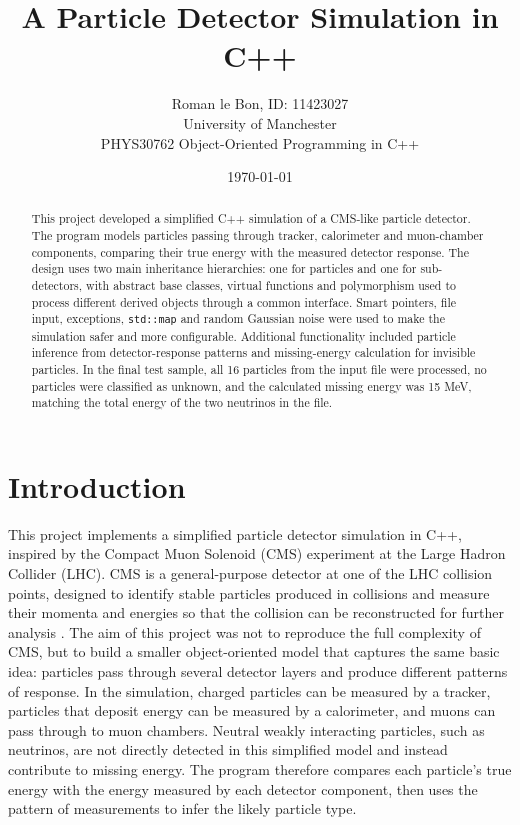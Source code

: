\documentclass[11pt,a4paper]{article}
\title{A Particle Detector Simulation in C++}
\author{Roman le Bon, ID: 11423027\\ University of Manchester \\ PHYS30762 Object-Oriented Programming in C++}
\date{\today}
\begin{document}
\maketitle

\begin{abstract}
This project developed a simplified C++ simulation of a CMS-like particle detector. The program models particles passing through tracker, calorimeter and muon-chamber components, comparing their true energy with the measured detector response. The design uses two main inheritance hierarchies: one for particles and one for sub-detectors, with abstract base classes, virtual functions and polymorphism used to process different derived objects through a common interface. Smart pointers, file input, exceptions, \texttt{std::map} and random Gaussian noise were used to make the simulation safer and more configurable. Additional functionality included particle inference from detector-response patterns and missing-energy calculation for invisible particles. In the final test sample, all 16 particles from the input file were processed, no particles were classified as unknown, and the calculated missing energy was 15 MeV, matching the total energy of the two neutrinos in the file.
\end{abstract}

\section{Introduction}

This project implements a simplified particle detector simulation in C++, inspired by the Compact Muon Solenoid (CMS) experiment at the Large Hadron Collider (LHC). CMS is a general-purpose detector at one of the LHC collision points, designed to identify stable particles produced in collisions and measure their momenta and energies so that the collision can be reconstructed for further analysis \cite{cmsdetector}. The aim of this project was not to reproduce the full complexity of CMS, but to build a smaller object-oriented model that captures the same basic idea: particles pass through several detector layers and produce different patterns of response. In the simulation, charged particles can be measured by a tracker, particles that deposit energy can be measured by a calorimeter, and muons can pass through to muon chambers. Neutral weakly interacting particles, such as neutrinos, are not directly detected in this simplified model and instead contribute to missing energy. The program therefore compares each particle's true energy with the energy measured by each detector component, then uses the pattern of measurements to infer the likely particle type.
\end{document}
